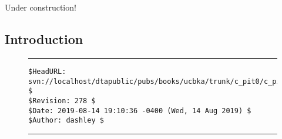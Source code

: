
\chapter{\cpitzerolongtitle{}}

\label{cpit0}

                     {Under construction!}


\section{Introduction}



\vfill
\noindent\begin{figure}[!b]
\noindent\rule[-0.25in]{\textwidth}{1pt}
\begin{tiny}
\begin{verbatim}
$HeadURL: svn://localhost/dtapublic/pubs/books/ucbka/trunk/c_pit0/c_pit0.tex $
$Revision: 278 $
$Date: 2019-08-14 19:10:36 -0400 (Wed, 14 Aug 2019) $
$Author: dashley $
\end{verbatim}
\end{tiny}
\noindent\rule[0.25in]{\textwidth}{1pt}
\end{figure}

%
